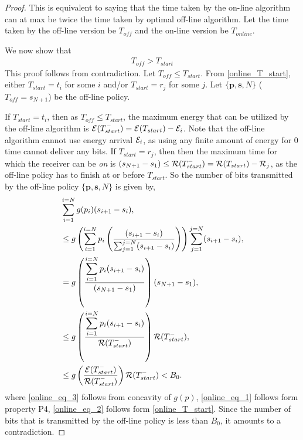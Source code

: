 \begin{proof}
This is equivalent to saying that the time taken by the on-line algorithm can at max be twice the time taken by optimal off-line algorithm. Let the time taken by the off-line version be $T_{off}$ and the on-line version be $T_{online}$. 

We now show that 
\begin{align}
T_{off} > T_{start}
\label{online_time}
\end{align}
This proof follows from contradiction. Let $T_{off}\le T_{start}$. From \eqref{online_T_start}, either $T_{start}=t_i$ for some $i$ and/or $T_{start}=r_j$ for some $j$. Let $\{\textbf{p},\textbf{s},N\}$ ($T_{off}=s_{N+1}$) be the off-line policy.

If $T_{start}=t_i$, then as $T_{off}\le T_{start}$, the maximum energy that can be utilized by the off-line algorithm is $\mathcal{E}(T_{start}^-)=\mathcal{E}(T_{start})-\mathcal{E}_i$. Note that the off-line algorithm cannot use energy arrival $\mathcal{E}_i$, as using any finite amount of energy for 0 time cannot deliver any bits. If $T_{start}=r_j$, then then the maximum time for which the receiver can be \textit{on} is $(s_{N+1}-s_1) \le\mathcal{R}(T_{start}^-)=\mathcal{R}(T_{start})-\mathcal{R}_j$, as the off-line policy has to finish at or before $T_{start}$. 
So the number of bits transmitted by the off-line policy $\{\textbf{p},\textbf{s},N\}$ is given by,
\begin{align}
&\sum_{i=1}^{i=N} g(p_i)(s_{i+1}-s_{i}),
\\
&\le g\left(\sum_{i=1}^{i=N}p_i\left(\frac{(s_{i+1}-s_{i})}{\sum_{j=1}^{j=N}(s_{i+1}-s_{i})}\right)\right) \sum_{j=1}^{j=N} (s_{i+1}-s_{i}),\label{online_eq_3}
\\
&=g\left(\frac{\displaystyle\sum_{i=1}^{i=N}p_i(s_{i+1}-s_{i})}{(s_{N+1}-s_{1})}\right)(s_{N+1}-s_{1}),\label{online_eq_4} 
\\
&\le g\left(\frac{\displaystyle\sum_{i=1}^{i=N}p_i(s_{i+1}-s_{i})}{\TRx(T_{start}^-)}\right)\TRx(T_{start}^-), \label{online_eq_1}
\\
&\le g\left(\frac{\ETx(T_{start}^-)}{\TRx(T_{start}^-)}\right)\TRx(T_{start}^-)<B_0.\label{online_eq_2}
\end{align}
where \eqref{online_eq_3} follows from concavity of $g(p)$, \eqref{online_eq_1} follows form property P4, \eqref{online_eq_2} follows form \eqref{online_T_start}. Since the number of bits that is transmitted by the off-line policy is less than $B_0$, it amounts to a contradiction.

\end{proof}
